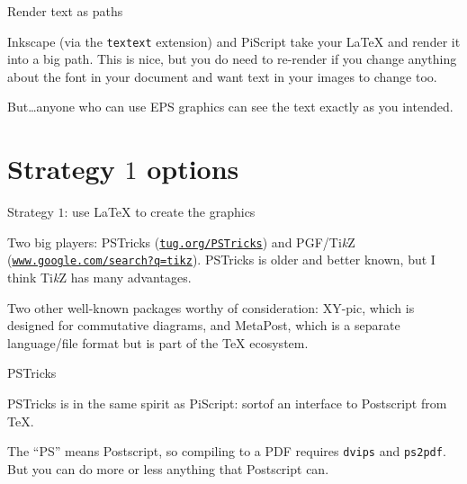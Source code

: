 \documentclass{beamer}
\newcommand{\myhref}[1]{\href{http://#1}{\texttt{#1}}}
\begin{document}
\begin{frame}{Render text as paths}

  Inkscape (via the \texttt{textext} extension) and PiScript take your
  \LaTeX{} and render it into a big path. This is nice, but you do need
  to re-render if you change anything about the font in your document
  and want text in your images to change too.

  \pause\vspace{10pt}

  But\ldots anyone who can use EPS graphics can see the text exactly as
  you intended.

\end{frame}

\newcommand{\tikZ}{Ti\emph{k}Z}

\section{Strategy \texorpdfstring{$1$}{1} options}

\begin{frame}{Strategy \texorpdfstring{$1$}{1}: use \LaTeX{}
  to create the graphics}

  Two big players: PSTricks (\myhref{tug.org/PSTricks}) and PGF/\tikZ{}
  (\myhref{www.google.com/search?q=tikz}). PSTricks is older and better
  known, but I think \tikZ{} has many advantages.

  \pause\vspace{10pt}

  Two other well-known packages worthy of consideration: XY-pic, which
  is designed for commutative diagrams, and MetaPost, which is a
  separate language/file format but is part of the \TeX{} ecosystem.

\end{frame}

\begin{frame}{PSTricks}

  PSTricks is in the same spirit as PiScript: sortof an interface to
  Postscript from \TeX.\\

  \pause\vspace{10pt}

  The ``PS'' means Postscript, so compiling to a PDF requires
  \texttt{dvips} and \texttt{ps2pdf}. But you can do more or less
  anything that Postscript can.

\end{frame}
\end{document}
